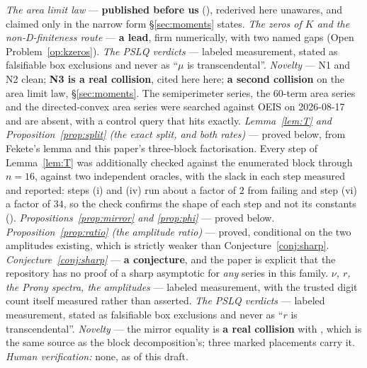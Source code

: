 \documentclass[11pt]{article}
\begin{document}
{\emph{The area limit law} --- \textbf{published before us}
(\cite{richard2007,entingGuttmann1989}), rederived here unawares, and claimed
only in the narrow form \S\ref{sec:moments} states.
\emph{The zeros of $K$ and the non-D-finiteness route} --- \textbf{a lead}, firm
numerically, with two named gaps (Open Problem~\ref{op:kzeros}).
\emph{The PSLQ verdicts} --- labeled measurement, stated as falsifiable box
exclusions and never as ``$\mu$ is transcendental''.
\emph{Novelty} --- N1 and N2 clean; \textbf{N3 is a real collision}, cited here
here; \textbf{a second collision} on the area limit law, \S\ref{sec:moments}.
The semiperimeter series, the $60$-term area series and the directed-convex area
series were searched against OEIS on 2026-08-17 and are absent, with a control
query that hits  exactly.
\emph{Lemma~\ref{lem:T} and Proposition~\ref{prop:split} (the exact split, and
both rates)} --- proved below, from Fekete's lemma and this paper's
three-block factorisation. Every step of Lemma~\ref{lem:T} was additionally
checked against the enumerated block through $n = 16$, against two independent
oracles, with the slack in each step measured and reported: steps (i) and (iv)
run about a factor of $2$ from failing and step (vi) a factor of $34$, so the
check confirms the shape of each step and not its constants
().
\emph{Propositions~\ref{prop:mirror} and \ref{prop:phi}} --- proved below.
\emph{Proposition~\ref{prop:ratio} (the amplitude ratio)} --- proved,
conditional on the two amplitudes existing, which is strictly weaker than
Conjecture~\ref{conj:sharp}.
\emph{Conjecture~\ref{conj:sharp}} --- \textbf{a conjecture}, and the paper is
explicit that the repository has no proof of a sharp asymptotic for \emph{any}
series in this family.
\emph{$\nu$, $r$, the Prony spectra, the amplitudes} --- labeled measurement,
with the trusted digit count itself measured rather than asserted.
\emph{The PSLQ verdicts} --- labeled measurement, stated as falsifiable box
exclusions and never as ``$r$ is transcendental''.
\emph{Novelty} --- the mirror equality is \textbf{a real collision} with
\cite{gblRoux2004}, which is the same source as the block decomposition's;
three marked placements carry it.
\emph{Human verification:} none, as of this draft.}
\end{document}
